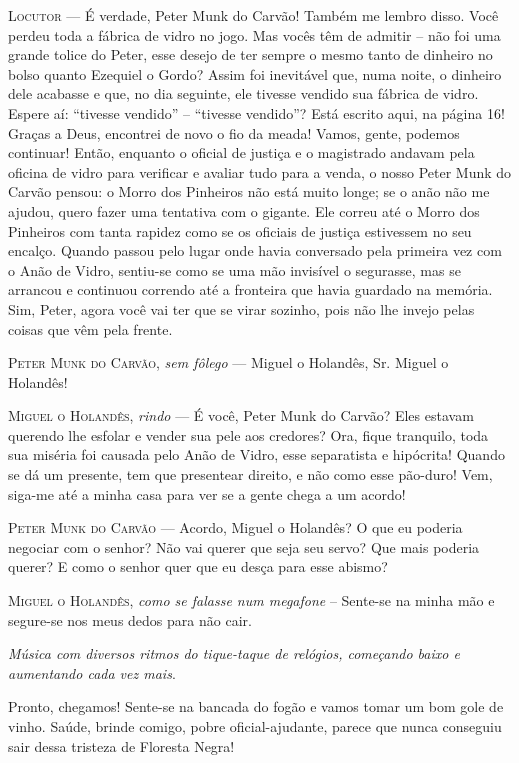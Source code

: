 \begin{myparindent}{0pt}
\begin{Parskip}
\textsc{Locutor} --- É verdade, Peter Munk do Carvão! Também me lembro disso. Você
perdeu toda a fábrica de vidro no jogo. Mas vocês têm de admitir -- não
foi uma grande tolice do Peter, esse desejo de ter sempre o mesmo tanto
de dinheiro no bolso quanto Ezequiel o Gordo? Assim foi inevitável que,
numa noite, o dinheiro dele acabasse e que, no dia seguinte, ele tivesse
vendido sua fábrica de vidro. Espere aí: ``tivesse vendido'' --
``tivesse vendido''? Está escrito aqui, na página 16! Graças a Deus,
encontrei de novo o fio da meada! Vamos, gente, podemos continuar!
Então, enquanto o oficial de justiça e o magistrado andavam pela oficina
de vidro para verificar e avaliar tudo para a venda, o nosso Peter Munk
do Carvão pensou: o Morro dos Pinheiros não está muito longe; se o anão
não me ajudou, quero fazer uma tentativa com o gigante. Ele correu até o
Morro dos Pinheiros com tanta rapidez como se os oficiais de justiça
estivessem no seu encalço. Quando passou pelo lugar onde havia
conversado pela primeira vez com o Anão de Vidro, sentiu-se como se uma
mão invisível o segurasse, mas se arrancou e continuou correndo até a
fronteira que havia guardado na memória. Sim, Peter, agora você vai ter
que se virar sozinho, pois não lhe invejo pelas coisas que vêm pela
frente.

\textsc{Peter Munk do Carvão}, \emph{sem fôlego} --- Miguel o Holandês, Sr. Miguel
o Holandês!

\textsc{Miguel o Holandês}, \emph{rindo} --- É você, Peter Munk do Carvão? Eles
estavam querendo lhe esfolar e vender sua pele aos credores? Ora, fique
tranquilo, toda sua miséria foi causada pelo Anão de Vidro, esse
separatista e hipócrita! Quando se dá um presente, tem que presentear
direito, e não como esse pão-duro! Vem, siga-me até a minha casa para
ver se a gente chega a um acordo!

\textsc{Peter Munk do Carvão} --- Acordo, Miguel o Holandês? O que eu poderia
negociar com o senhor? Não vai querer que seja seu servo? Que mais
poderia querer? E como o senhor quer que eu desça para esse abismo?

\textsc{Miguel o Holandês}, \emph{como se falasse num megafone} -- Sente-se na
minha mão e segure-se nos meus dedos para não cair.

\emph{Música com diversos ritmos do tique-taque de relógios, começando
baixo e aumentando cada vez mais}.

Pronto, chegamos! Sente-se na bancada do fogão e vamos tomar um bom gole
de vinho. Saúde, brinde comigo, pobre oficial-ajudante, parece que nunca
conseguiu sair dessa tristeza de Floresta Negra!


\end{Parskip}
\end{myparindent}
